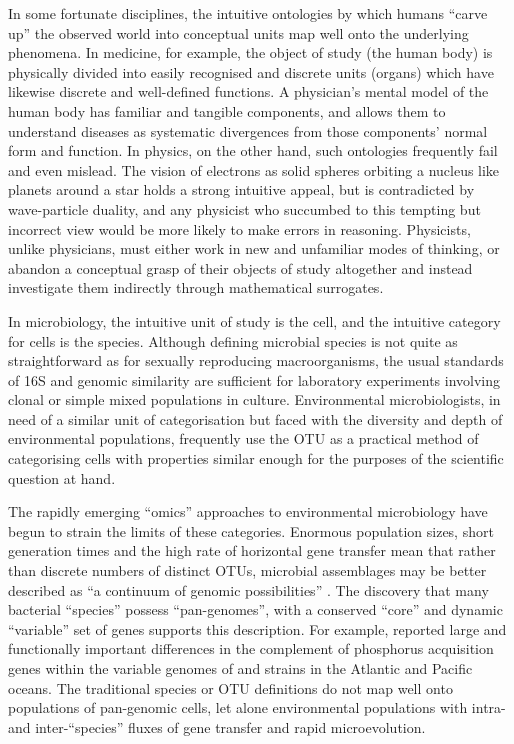 In some fortunate disciplines, the intuitive ontologies by which humans ``carve up'' the observed world into conceptual units map well onto the underlying phenomena.
In medicine, for example, the object of study (the human body) is physically divided into easily recognised and discrete units (organs) which have likewise discrete and well-defined functions.
A physician's mental model of the human body has familiar and tangible components, and allows them to understand diseases as systematic divergences from those components' normal form and function.
In physics, on the other hand, such ontologies frequently fail and even mislead.
The vision of electrons as solid spheres orbiting a nucleus like planets around a star holds a strong intuitive appeal, but is contradicted by wave-particle duality, and any physicist who succumbed to this tempting but incorrect view would be more likely to make errors in reasoning.
Physicists, unlike physicians, must either work in new and unfamiliar modes of thinking, or abandon a conceptual grasp of their objects of study altogether and instead investigate them indirectly through mathematical surrogates.

In microbiology, the intuitive unit of study is the cell, and the intuitive category for cells is the species.
Although defining microbial species is not quite as straightforward as for sexually reproducing macroorganisms, the usual standards of 16S and genomic similarity are sufficient for laboratory experiments involving clonal or simple mixed populations in culture.
Environmental microbiologists, in need of a similar unit of categorisation but faced with the diversity and depth of environmental populations, frequently use the \ac{OTU} as a practical method of categorising cells with properties similar enough for the purposes of the scientific question at hand.

The rapidly emerging ``omics'' approaches to environmental microbiology have begun to strain the limits of these categories.
Enormous population sizes, short generation times and the high rate of horizontal gene transfer mean that rather than discrete numbers of distinct \acp{OTU}, microbial assemblages may be better described as ``a continuum of genomic possibilities'' \cite{Goldenfeld:2007im}.
The discovery that many bacterial ``species'' possess ``pan-genomes'', with a conserved ``core'' and dynamic ``variable'' set of genes \cite{Tettelin:2005jg} supports this description.
For example, \citet{Coleman:2010jj} reported large and functionally important differences in the complement of phosphorus acquisition genes within the variable genomes of  and  strains in the Atlantic and Pacific oceans.
The traditional species or \ac{OTU} definitions do not map well onto populations of pan-genomic cells, let alone environmental populations with intra- and inter-``species'' fluxes of gene transfer and rapid microevolution.

